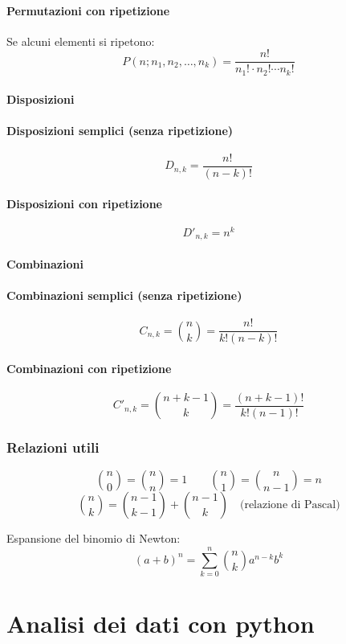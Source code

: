 \documentclass{article}
\begin{document}
\paragraph{Permutazioni con ripetizione}
Se alcuni elementi si ripetono:
\[
P(n; n_1, n_2, \ldots, n_k) = \frac{n!}{n_1! \cdot n_2! \cdots n_k!}
\]

\paragraph{Disposizioni}

\paragraph{Disposizioni semplici (senza ripetizione)}
\[
D_{n,k} = \frac{n!}{(n-k)!}
\]

\paragraph{Disposizioni con ripetizione}
\[
D'_{n,k} = n^k
\]

\paragraph{Combinazioni}

\paragraph{Combinazioni semplici (senza ripetizione)}
\[
C_{n,k} = \binom{n}{k} = \frac{n!}{k!(n-k)!}
\]

\paragraph{Combinazioni con ripetizione}
\[
C'_{n,k} = \binom{n+k-1}{k} = \frac{(n+k-1)!}{k!(n-1)!}
\]

\subsubsection{Relazioni utili}
\[
\binom{n}{0} = \binom{n}{n} = 1 \quad \quad \binom{n}{1} = \binom{n}{n-1} = n
\]
\[
\binom{n}{k} = \binom{n-1}{k-1} + \binom{n-1}{k} \quad \text{(relazione di Pascal)}
\]

Espansione del binomio di Newton:
\[
(a + b)^n = \sum_{k=0}^{n} \binom{n}{k} a^{n-k} b^k
\]

\section{Analisi dei dati con python}
\end{document}
